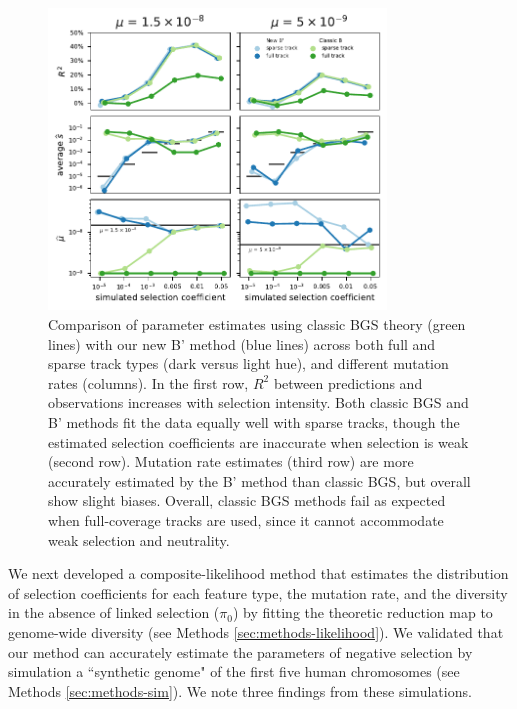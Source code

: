 \documentclass[11pt]{article}
\begin{document}
\begin{figure}[htbp] \centering
    \includegraphics[width=0.8\textwidth]{figures/figure_2.pdf} 
    \caption{Comparison of parameter estimates using classic BGS theory (green
        lines) with our new B' method (blue lines) across both full and sparse
        track types (dark versus light hue), and different mutation rates
        (columns). In the first row, $R^2$ between predictions and observations
        increases with selection intensity. Both classic BGS and B' methods fit
        the data equally well with sparse tracks, though the estimated
        selection coefficients are inaccurate when selection is weak (second
        row). Mutation rate estimates (third row) are more accurately estimated
        by the B' method than classic BGS, but overall show slight biases.
        Overall, classic BGS methods fail as expected when full-coverage tracks
    are used, since it cannot accommodate weak selection and neutrality. }
  \label{fig:figure-2}
\end{figure}

We next developed a composite-likelihood method that estimates the distribution
of selection coefficients for each feature type, the mutation rate, and the
diversity in the absence of linked selection ($\pi_0$) by fitting the theoretic
reduction map to genome-wide diversity (see Methods
\ref{sec:methods-likelihood}). We validated that our method can accurately
estimate the parameters of negative selection by simulation a ``synthetic
genome" of the first five human chromosomes (see Methods
\ref{sec:methods-sim}). We note three findings from these simulations.
\end{document}
